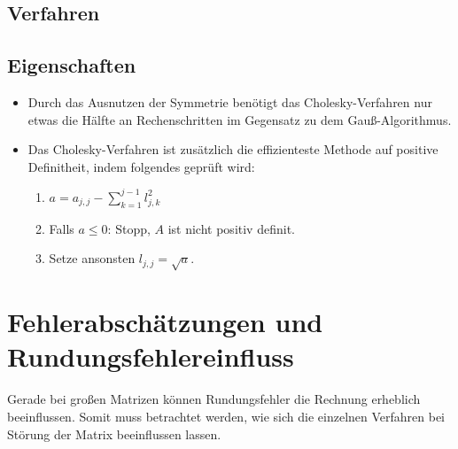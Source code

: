         \subsection{Verfahren}
            \begin{algorithm}[H]
            \end{algorithm}

        \subsection{Eigenschaften}
	        \begin{itemize}
	        	\item Durch das Ausnutzen der Symmetrie benötigt das Cholesky-Verfahren nur etwas die Hälfte an Rechenschritten im Gegensatz zu dem Gauß-Algorithmus.
	        	\item Das Cholesky-Verfahren ist zusätzlich die effizienteste Methode auf positive Definitheit, indem folgendes geprüft wird:
	        	\begin{enumerate}
	        		\item \( a = a_{j,j} - \sum_{k=1}^{j-1} l_{j,k}^2 \)
	        		\item Falls \( a \leq 0 \): Stopp, \(A\) ist nicht positiv definit.
	        		\item Setze ansonsten \( l_{j,j} = \sqrt{a} \).
	        	\end{enumerate}
	        \end{itemize}

    \section{Fehlerabschätzungen und Rundungsfehlereinfluss}
        Gerade bei großen Matrizen können Rundungsfehler die Rechnung erheblich beeinflussen. Somit muss betrachtet werden, wie sich die einzelnen Verfahren bei Störung der Matrix beeinflussen lassen.

